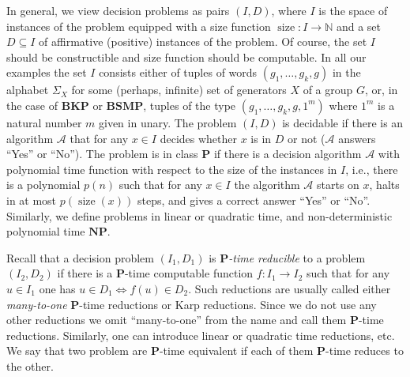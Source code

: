 \documentclass[10pt]{amsart}
\theoremstyle{definition}
\DeclareMathOperator{\size}{{size}}
\def\P{{\mathbf{P}}}
\def\NP{{\mathbf{NP}}}
\def\BSMP{{\mathbf{BSMP}}}
\def\BKP{{\mathbf{BKP}}}
\begin{document}
In general, we view decision problems as pairs $(I,D)$, where $I$ is the space of instances of
the problem equipped with a  size function $\size: I \to \mathbb N$ and
a set $D \subseteq I$ of affirmative (positive) instances of the problem.
Of course, the set $I$ should be constructible and size function  should be computable.
In all our examples the set $I$ consists either of tuples of words $(g_1, \ldots,g_k,g)$ in
the   alphabet $\Sigma_X$ for some (perhaps, infinite) set of generators $X$ of a group $G$, or,
in the case of  $\BKP$  or $\BSMP$,
tuples of the type  $(g_1, \ldots,g_k,g,1^m)$ where $1^m$ is
a natural number $m$ given in unary.
The problem $(I,D)$ is decidable if there is an algorithm ${\mathcal A}$
that for any $x \in I$ decides whether  $x$ is in $D$ or not (${\mathcal A}$  answers ``Yes'' or ``No'').
The problem is in class $\P$ if there is a decision algorithm ${\mathcal A}$
with polynomial  time function with respect to the size of the instances in $I$, i.e.,
there is a polynomial $p(n)$ such that for any $x \in I$ the algorithm ${\mathcal A}$ starts on $x$,
halts in at most $p(\size(x))$ steps, and gives a correct answer ``Yes'' or ``No''.
Similarly, we define problems in linear  or quadratic time, and non-deterministic polynomial time $\NP$.


Recall that a decision problem $(I_1,D_1)$ is  {\em $\P$-time  reducible}
to  a problem $(I_2,D_2)$ if there is a $\P$-time computable function
$f:I_1  \to I_2$  such that for any $u \in I_1$ one has $u \in D_1 \Longleftrightarrow f(u) \in D_2$.
Such reductions are usually called either {\em many-to-one} $\P$-time reductions or Karp reductions.
Since we do not use any other reductions we omit ``many-to-one'' from the name and call them $\P$-time reductions.  Similarly, one can introduce linear or quadratic time reductions, etc. We say that two problem are $\P$-time equivalent if each of them $\P$-time reduces to the other.
\end{document}
